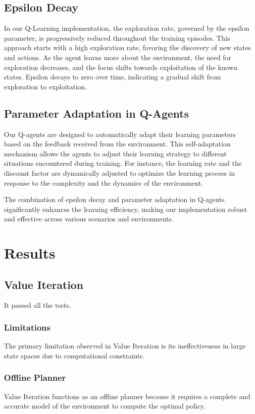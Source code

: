 \documentclass{article}
\begin{document}
\subsection{Epsilon Decay}
In our Q-Learning implementation, the exploration rate, 
governed by the epsilon parameter, 
is progressively reduced throughout the training episodes. 
This approach starts with a high exploration rate, 
favoring the discovery of new states and actions. 
As the agent learns more about the environment, 
the need for exploration decreases, 
and the focus shifts towards exploitation of the known states. 
Epsilon decays to zero over time, 
indicating a gradual shift from exploration to exploitation.

\subsection{Parameter Adaptation in Q-Agents}
Our Q-agents are designed to automatically adapt their learning parameters 
based on the feedback received from the environment. This self-adaptation mechanism allows 
the agents to adjust their learning strategy to different situations encountered during training. 
For instance, the learning rate and the discount factor are dynamically adjusted 
to optimize the learning process in response to the complexity and the dynamics of the environment.

The combination of epsilon decay and parameter adaptation in Q-agents significantly enhances the learning efficiency, 
making our implementation robust and effective across various scenarios and environments.

\section{Results}
\subsection{Value Iteration}
It passed all the tests.
\subsubsection{Limitations}
The primary limitation observed in Value Iteration is its ineffectiveness in large state spaces due to computational constraints.

\subsubsection{Offline Planner}
Value Iteration functions as an offline planner because 
it requires a complete and accurate model of the environment to compute the optimal policy.
\end{document}
